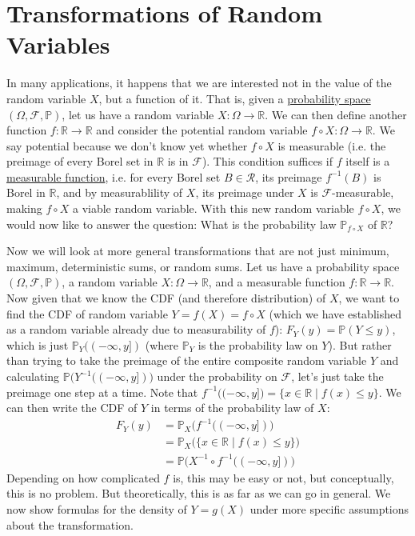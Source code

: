 \section{Transformations of Random Variables} 

  In many applications, it happens that we are interested not in the value of the random variable $X$, but a function of it. That is, given a \hyperref[def:probability-space]{probability space} $(\Omega, \mathcal{F}, \mathbb{P})$, let us have a random variable $X: \Omega \rightarrow \mathbb{R}$. We can then define another function $f: \mathbb{R} \rightarrow \mathbb{R}$ and consider the potential random variable $f \circ X : \Omega \rightarrow \mathbb{R}$. We say potential because we don't know yet whether $f \circ X$ is measurable (i.e. the preimage of every Borel set in $\mathbb{R}$ is in $\mathcal{F}$). This condition suffices if $f$ itself is a \hyperref[mt-def:measurable-function]{measurable function}, i.e. for every Borel set $B \in \mathcal{R}$, its preimage $f^{-1} (B)$ is Borel in $\mathbb{R}$, and by measurablility of $X$, its preimage under $X$ is $\mathcal{F}$-measurable, making $f \circ X$ a viable random variable. With this new random variable $f \circ X$, we would now like to answer the question: What is the probability law $\mathbb{P}_{f \circ X}$ of $\mathbb{R}$? 

  Now we will look at more general transformations that are not just minimum, maximum, deterministic sums, or random sums. Let us have a probability space $(\Omega, \mathcal{F}, \mathbb{P})$, a random variable $X: \Omega \rightarrow \mathbb{R}$, and a measurable function $f: \mathbb{R} \rightarrow \mathbb{R}$. Now given that we know the CDF (and therefore distribution) of $X$, we want to find the CDF of random variable $Y = f(X) = f \circ X$ (which we have established as a random variable already due to measurability of $f$): $F_Y (y) = \mathbb{P}(Y \leq y)$, which is just $\mathbb{P}_Y ((-\infty, y])$ (where $\mathbb{P}_Y$ is the probability law on $Y$). But rather than trying to take the preimage of the entire composite random variable $Y$ and calculating $\mathbb{P}\big( Y^{-1}((-\infty, y]) \big)$ under the probability on $\mathcal{F}$, let's just take the preimage one step at a time. Note that $f^{-1} \big( (-\infty, y] \big) = \{x \in \mathbb{R} \mid f(x) \leq y\}$. We can then write the CDF of $Y$ in terms of the probability law of $X$: 
  \begin{align*}
    F_Y (y) & = \mathbb{P}_X \big( f^{-1} ((-\infty, y]) \big) \\
    & = \mathbb{P}_X \big( \{x \in \mathbb{R} \mid f(x) \leq y\} \big) \\
    & = \mathbb{P} \big( X^{-1} \circ f^{-1} ((-\infty, y]) \big) 
  \end{align*}
  Depending on how complicated $f$ is, this may be easy or not, but conceptually, this is no problem. But theoretically, this is as far as we can go in general. We now show formulas for the density of $Y = g(X)$ under more specific assumptions about the transformation. 

